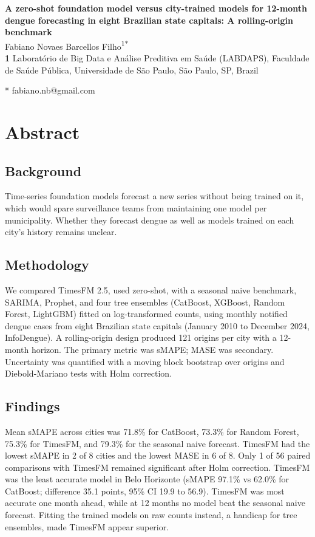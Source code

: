 \documentclass[10pt,letterpaper]{article}
\begin{document}
\vspace*{0.2in}

\begin{flushleft}
{\Large
\textbf{A zero-shot foundation model versus city-trained models for 12-month dengue forecasting in eight Brazilian state capitals: A rolling-origin benchmark}
}
\newline
\\
Fabiano Novaes Barcellos Filho\textsuperscript{1*}
\\
\bigskip
\textbf{1} Laborat\'orio de Big Data e An\'alise Preditiva em Sa\'ude (LABDAPS), Faculdade de Sa\'ude P\'ublica, Universidade de S\~ao Paulo, S\~ao Paulo, SP, Brazil
\\
\bigskip

* fabiano.nb@gmail.com

\end{flushleft}

\section*{Abstract}
\subsection*{Background}
Time-series foundation models forecast a new series without being trained on it, which would spare surveillance teams from maintaining one model per municipality. Whether they forecast dengue as well as models trained on each city's history remains unclear.

\subsection*{Methodology}
We compared TimesFM 2.5, used zero-shot, with a seasonal naive benchmark, SARIMA, Prophet, and four tree ensembles (CatBoost, XGBoost, Random Forest, LightGBM) fitted on log-transformed counts, using monthly notified dengue cases from eight Brazilian state capitals (January 2010 to December 2024, InfoDengue). A rolling-origin design produced 121 origins per city with a 12-month horizon. The primary metric was sMAPE; MASE was secondary. Uncertainty was quantified with a moving block bootstrap over origins and Diebold-Mariano tests with Holm correction.

\subsection*{Findings}
Mean sMAPE across cities was 71.8\% for CatBoost, 73.3\% for Random Forest, 75.3\% for TimesFM, and 79.3\% for the seasonal naive forecast. TimesFM had the lowest sMAPE in 2 of 8 cities and the lowest MASE in 6 of 8. Only 1 of 56 paired comparisons with TimesFM remained significant after Holm correction. TimesFM was the least accurate model in Belo Horizonte (sMAPE 97.1\% vs 62.0\% for CatBoost; difference 35.1 points, 95\% CI 19.9 to 56.9). TimesFM was most accurate one month ahead, while at 12 months no model beat the seasonal naive forecast. Fitting the trained models on raw counts instead, a handicap for tree ensembles, made TimesFM appear superior.
\end{document}
